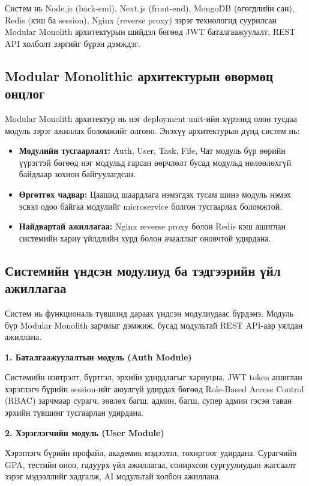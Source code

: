 Систем нь Node.js (back-end), Next.js (front-end), MongoDB (өгөгдлийн сан),  Redis (кэш ба session), Nginx (reverse proxy) зэрэг технологид суурилсан Modular Monolith архитектурын шийдэл бөгөөд JWT баталгаажуулалт, REST API холболт зэргийг бүрэн дэмждэг.

\subsection*{Modular Monolithic архитектурын өвөрмөц онцлог}

Modular Monolith архитектур нь нэг deployment unit-ийн хүрээнд олон тусдаа модуль зэрэг ажиллах боломжийг олгоно. Энэхүү архитектурын дүнд систем нь:

\begin{itemize}
    \item \textbf{Модулийн тусгаарлалт:} Auth, User, Task, File, Чат модуль бүр өөрийн үүрэгтэй бөгөөд нэг модульд гарсан өөрчлөлт бусад модульд нөлөөлөхгүй байдлаар зохион байгуулагдсан.
    \item \textbf{Өргөтгөх чадвар:} Цаашид шаардлага нэмэгдэх тусам шинэ модуль нэмэх эсвэл одоо байгаа модулийг microservice болгон тусгаарлах боломжтой.
    \item \textbf{Найдвартай ажиллагаа:} Nginx reverse proxy болон Redis кэш ашиглан системийн хариу үйлдлийн хурд болон ачааллыг оновчтой удирдана.
\end{itemize}

\subsection*{Системийн үндсэн модулиуд ба тэдгээрийн үйл ажиллагаа}

Систем нь функциональ түвшинд дараах үндсэн модулиудаас бүрдэнэ. Модуль бүр Modular Monolith зарчмыг дэмжиж, бусад модультай REST API-аар уялдан ажиллана.

\textbf{1. Баталгаажуулалтын модуль (Auth Module)}

Системийн нэвтрэлт, бүртгэл, эрхийн удирдлагыг хариуцна. JWT token ашиглан хэрэглэгч бүрийн session-ийг аюулгүй удирдах бөгөөд Role-Based Access Control (RBAC) зарчмаар сурагч, зөвлөх багш, админ, багш, супер админ гэсэн таван эрхийн түвшинг тусгаарлан удирдана.

\textbf{2. Хэрэглэгчийн модуль (User Module)}

Хэрэглэгч бүрийн профайл, академик мэдээлэл, тохиргоог удирдана. Сурагчийн GPA, тестийн оноо, гадуурх үйл ажиллагаа, сонирхсон сургуулиудын жагсаалт зэрэг мэдээллийг хадгалж, AI модультай холбон ажиллана.

